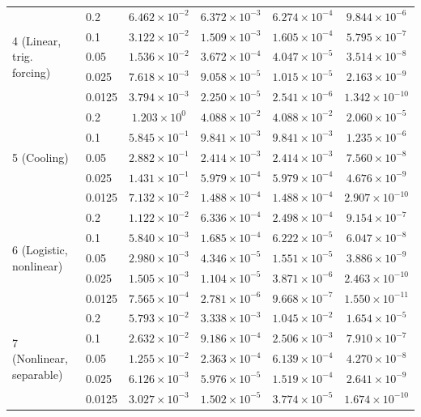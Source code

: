 \documentclass[10pt,letterpaper]{article}
\begin{document}
{\begin{longtable}{@{}llcccc@{}}
\midrule
\multirow{5}{*}{4 (Linear, trig. forcing)} & 0.2 & $6.462\times10^{-2}$ & $6.372\times10^{-3}$ & $6.274\times10^{-4}$ & $9.844\times10^{-6}$ \\
 & 0.1 & $3.122\times10^{-2}$ & $1.509\times10^{-3}$ & $1.605\times10^{-4}$ & $5.795\times10^{-7}$ \\
 & 0.05 & $1.536\times10^{-2}$ & $3.672\times10^{-4}$ & $4.047\times10^{-5}$ & $3.514\times10^{-8}$ \\
 & 0.025 & $7.618\times10^{-3}$ & $9.058\times10^{-5}$ & $1.015\times10^{-5}$ & $2.163\times10^{-9}$ \\
 & 0.0125 & $3.794\times10^{-3}$ & $2.250\times10^{-5}$ & $2.541\times10^{-6}$ & $1.342\times10^{-10}$ \\
\midrule
\multirow{5}{*}{5 (Cooling)} & 0.2 & $1.203\times10^{0}$ & $4.088\times10^{-2}$ & $4.088\times10^{-2}$ & $2.060\times10^{-5}$ \\
 & 0.1 & $5.845\times10^{-1}$ & $9.841\times10^{-3}$ & $9.841\times10^{-3}$ & $1.235\times10^{-6}$ \\
 & 0.05 & $2.882\times10^{-1}$ & $2.414\times10^{-3}$ & $2.414\times10^{-3}$ & $7.560\times10^{-8}$ \\
 & 0.025 & $1.431\times10^{-1}$ & $5.979\times10^{-4}$ & $5.979\times10^{-4}$ & $4.676\times10^{-9}$ \\
 & 0.0125 & $7.132\times10^{-2}$ & $1.488\times10^{-4}$ & $1.488\times10^{-4}$ & $2.907\times10^{-10}$ \\
\midrule
\multirow{5}{*}{6 (Logistic, nonlinear)} & 0.2 & $1.122\times10^{-2}$ & $6.336\times10^{-4}$ & $2.498\times10^{-4}$ & $9.154\times10^{-7}$ \\
 & 0.1 & $5.840\times10^{-3}$ & $1.685\times10^{-4}$ & $6.222\times10^{-5}$ & $6.047\times10^{-8}$ \\
 & 0.05 & $2.980\times10^{-3}$ & $4.346\times10^{-5}$ & $1.551\times10^{-5}$ & $3.886\times10^{-9}$ \\
 & 0.025 & $1.505\times10^{-3}$ & $1.104\times10^{-5}$ & $3.871\times10^{-6}$ & $2.463\times10^{-10}$ \\
 & 0.0125 & $7.565\times10^{-4}$ & $2.781\times10^{-6}$ & $9.668\times10^{-7}$ & $1.550\times10^{-11}$ \\
\midrule
\multirow{5}{*}{7 (Nonlinear, separable)} & 0.2 & $5.793\times10^{-2}$ & $3.338\times10^{-3}$ & $1.045\times10^{-2}$ & $1.654\times10^{-5}$ \\
 & 0.1 & $2.632\times10^{-2}$ & $9.186\times10^{-4}$ & $2.506\times10^{-3}$ & $7.910\times10^{-7}$ \\
 & 0.05 & $1.255\times10^{-2}$ & $2.363\times10^{-4}$ & $6.139\times10^{-4}$ & $4.270\times10^{-8}$ \\
 & 0.025 & $6.126\times10^{-3}$ & $5.976\times10^{-5}$ & $1.519\times10^{-4}$ & $2.641\times10^{-9}$ \\
 & 0.0125 & $3.027\times10^{-3}$ & $1.502\times10^{-5}$ & $3.774\times10^{-5}$ & $1.674\times10^{-10}$\\
\bottomrule
\end{longtable}}
\end{document}
